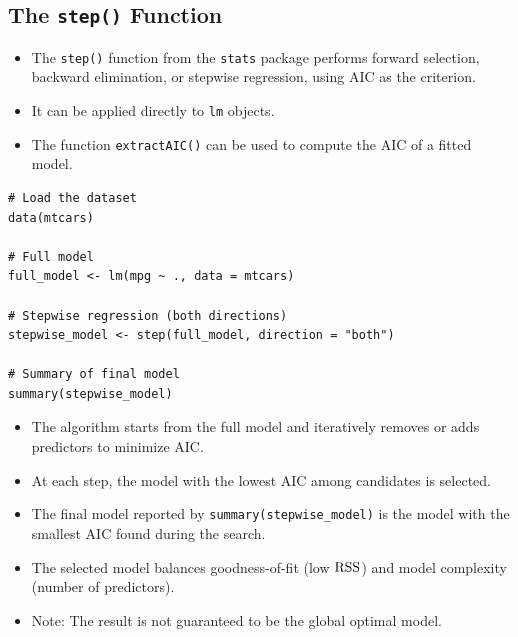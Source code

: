 \subsection{The \texttt{step()} Function}

\begin{notebox}
\begin{itemize}
\item The \texttt{step()} function from the \texttt{stats} package performs forward selection, backward elimination, or stepwise regression, using AIC as the criterion.

\item It can be applied directly to \texttt{lm} objects.

\item The function \texttt{extractAIC()} can be used to compute the AIC of a fitted model.
\end{itemize}
\end{notebox}

\begin{verbatim}
# Load the dataset
data(mtcars)

# Full model
full_model <- lm(mpg ~ ., data = mtcars)

# Stepwise regression (both directions)
stepwise_model <- step(full_model, direction = "both")

# Summary of final model
summary(stepwise_model)
\end{verbatim}

\begin{notebox}
\begin{itemize}
\item The algorithm starts from the full model and iteratively removes or adds predictors to minimize AIC.

\item At each step, the model with the lowest AIC among candidates is selected.

\item The final model reported by \texttt{summary(stepwise\_model)} is the model with the smallest AIC found during the search.

\item The selected model balances goodness-of-fit (low $\mathrm{RSS}$) and model complexity (number of predictors).

\item Note: The result is not guaranteed to be the global optimal model.
\end{itemize}
\end{notebox}

